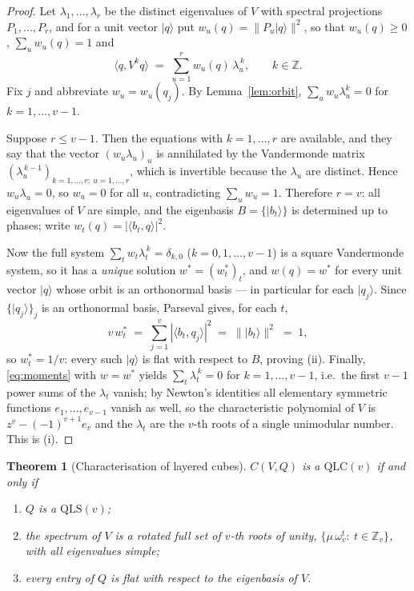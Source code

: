 \documentclass[11pt]{amsart}
\newtheorem{theorem}{Theorem}[section]
\theoremstyle{definition}
\newcommand{\Z}{\mathbb{Z}}
\newcommand{\ket}[1]{|#1\rangle}
\newcommand{\ip}[2]{\langle #1,#2\rangle}
\newcommand{\QLS}{\mathrm{QLS}}
\newcommand{\QLC}{\mathrm{QLC}}
\begin{document}
\begin{proof}
Let $\lambda_1,\dots,\lambda_r$ be the distinct eigenvalues of $V$ with
spectral projections $P_1,\dots,P_r$, and for a unit vector $\ket q$ put
$w_u(q)=\|P_u\ket q\|^2$, so that $w_u(q)\ge0$, $\sum_u w_u(q)=1$ and
\begin{equation}\label{eq:moments}
\ip{q}{V^kq}\;=\;\sum_{u=1}^{r} w_u(q)\,\lambda_u^{\,k},
\qquad k\in\Z .
\end{equation}
Fix $j$ and abbreviate $w_u=w_u(q_j)$.  By Lemma~\ref{lem:orbit},
$\sum_u w_u\lambda_u^k=0$ for $k=1,\dots,v-1$.

Suppose $r\le v-1$.  Then the equations with $k=1,\dots,r$ are available,
and they say that the vector $(w_u\lambda_u)_u$ is annihilated by the
Vandermonde matrix $(\lambda_u^{\,k-1})_{k=1,\dots,r;\ u=1,\dots,r}$, which
is invertible because the $\lambda_u$ are distinct.  Hence
$w_u\lambda_u=0$, so $w_u=0$ for all $u$, contradicting $\sum_u w_u=1$.
Therefore $r=v$: all eigenvalues of $V$ are simple, and the eigenbasis
$B=\{\ket{b_t}\}$ is determined up to phases; write
$w_t(q)=|\ip{b_t}{q}|^2$.

Now the full system $\sum_t w_t\lambda_t^{\,k}=\delta_{k,0}$
($k=0,1,\dots,v-1$) is a square Vandermonde system, so it has a
\emph{unique} solution $w^*=(w^*_t)_t$, and $w(q)=w^*$ for every unit
vector $\ket q$ whose orbit is an orthonormal basis --- in particular for
each $\ket{q_j}$.  Since $\{\ket{q_j}\}_j$ is an orthonormal basis,
Parseval gives, for each $t$,
\[
v\,w^*_t\;=\;\sum_{j=1}^{v}|\ip{b_t}{q_j}|^2\;=\;\|\ket{b_t}\|^2\;=\;1,
\]
so $w^*_t=1/v$: every such $\ket q$ is flat with respect to $B$, proving
(ii).  Finally, \eqref{eq:moments} with $w=w^*$ yields
$\sum_t\lambda_t^{\,k}=0$ for $k=1,\dots,v-1$, i.e.\ the first $v-1$ power
sums of the $\lambda_t$ vanish; by Newton's identities all elementary
symmetric functions $e_1,\dots,e_{v-1}$ vanish as well, so the
characteristic polynomial of $V$ is $z^v-(-1)^{v+1}e_v$ and the
$\lambda_t$ are the $v$-th roots of a single unimodular number.  This is
(i).
\end{proof}

\begin{theorem}[Characterisation of layered cubes]\label{thm:layered}
$C(V,Q)$ is a $\QLC(v)$ if and only if
\begin{enumerate}
\item[\textup{(a)}] $Q$ is a $\QLS(v)$;
\item[\textup{(b)}] the spectrum of $V$ is a rotated full set of $v$-th
roots of unity, $\{\mu\,\omega_v^t:\ t\in\Z_v\}$, with all eigenvalues
simple;
\item[\textup{(c)}] every entry of $Q$ is flat with respect to the
eigenbasis of $V$.
\end{enumerate}
\end{theorem}
\end{document}

